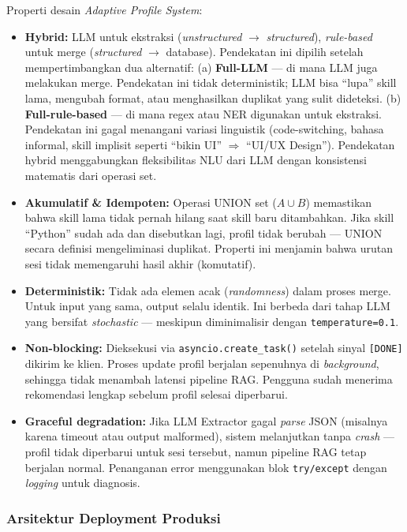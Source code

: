 Properti desain \textit{Adaptive Profile System}:
\begin{itemize}
  \item \textbf{Hybrid:} LLM untuk ekstraksi (\textit{unstructured} $\to$ \textit{structured}),
    \textit{rule-based} untuk merge (\textit{structured} $\to$ database).
    Pendekatan ini dipilih setelah mempertimbangkan dua alternatif:
    (a) \textbf{Full-LLM} --- di mana LLM juga melakukan merge. Pendekatan ini
    tidak deterministik; LLM bisa ``lupa'' skill lama, mengubah format, atau
    menghasilkan duplikat yang sulit dideteksi.
    (b) \textbf{Full-rule-based} --- di mana regex atau NER digunakan untuk
    ekstraksi. Pendekatan ini gagal menangani variasi linguistik (code-switching,
    bahasa informal, skill implisit seperti ``bikin UI'' $\Rightarrow$ ``UI/UX Design'').
    Pendekatan hybrid menggabungkan fleksibilitas NLU dari LLM dengan konsistensi
    matematis dari operasi set.
  \item \textbf{Akumulatif \& Idempoten:} Operasi UNION set ($A \cup B$) memastikan
    bahwa skill lama tidak pernah hilang saat skill baru ditambahkan.
    Jika skill ``Python'' sudah ada dan disebutkan lagi, profil tidak berubah ---
    UNION secara definisi mengeliminasi duplikat. Properti ini menjamin bahwa
    urutan sesi tidak memengaruhi hasil akhir (komutatif).
  \item \textbf{Deterministik:} Tidak ada elemen acak (\textit{randomness}) dalam
    proses merge. Untuk input yang sama, output selalu identik.
    Ini berbeda dari tahap LLM yang bersifat \textit{stochastic} ---
    meskipun diminimalisir dengan \texttt{temperature=0.1}.
  \item \textbf{Non-blocking:} Dieksekusi via \texttt{asyncio.create\_task()} setelah
    sinyal \texttt{[DONE]} dikirim ke klien. Proses update profil berjalan sepenuhnya
    di \textit{background}, sehingga tidak menambah latensi pipeline RAG.
    Pengguna sudah menerima rekomendasi lengkap sebelum profil selesai diperbarui.
  \item \textbf{Graceful degradation:} Jika LLM Extractor gagal \textit{parse} JSON
    (misalnya karena timeout atau output malformed), sistem melanjutkan tanpa
    \textit{crash} --- profil tidak diperbarui untuk sesi tersebut, namun
    pipeline RAG tetap berjalan normal. Penanganan error menggunakan
    blok \texttt{try/except} dengan \textit{logging} untuk diagnosis.
\end{itemize}

\subsubsection{Arsitektur Deployment Produksi}

